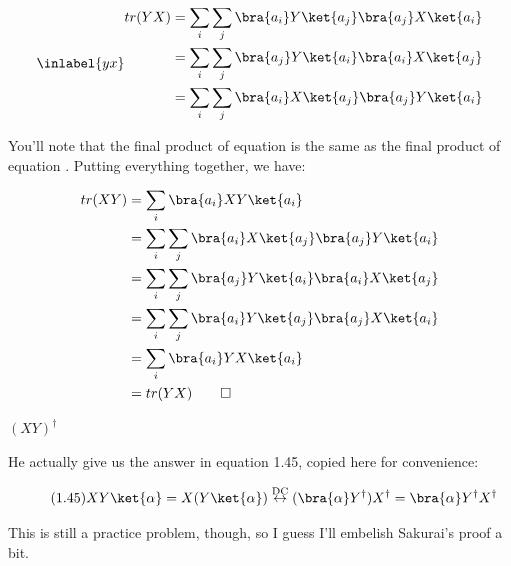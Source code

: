 \begin{answer}
\begin{equation}
  \inlabel{yx}
  \begin{split}
    tr(YX)
    &= \sum_i\sum_j\bra{a_i}Y\ket{a_j}\bra{a_j}X\ket{a_i}\\
    &= \sum_i\sum_j\bra{a_j}Y\ket{a_i}\bra{a_i}X\ket{a_j}\\
    &= \sum_i\sum_j\bra{a_i}X\ket{a_j}\bra{a_j}Y\ket{a_i}\\
  \end{split}
\end{equation}

You'll note that the final product of equation  is the same
as the final product of equation .  Putting everything
together, we have:

\begin{equation}
  \begin{split}
    tr(XY)
    &= \sum_i\bra{a_i}XY\ket{a_i}\\
    &= \sum_i\sum_j\bra{a_i}X\ket{a_j}\bra{a_j}Y\ket{a_i}\\
    &= \sum_i\sum_j\bra{a_j}Y\ket{a_i}\bra{a_i}X\ket{a_j}\\
    &= \sum_i\sum_j\bra{a_i}Y\ket{a_j}\bra{a_j}X\ket{a_i}\\
    &= \sum_i\bra{a_i}YX\ket{a_i}\\
    &= tr(YX) \qed\\
  \end{split}
\end{equation}




\begin{answerpart}{\texorpdfstring{$(XY)^\dagger$}{Hermitian of XY}}

  He actually give us the answer in equation 1.45, copied here for
  convenience:
  
  \begin{equation}
    \tag{1.45}
    XY\ket{\alpha}
    = X(Y\ket{\alpha})
    \overset{\text{DC}}{\leftrightarrow}
    (\bra{\alpha}Y^\dagger)X^\dagger
    = \bra{\alpha}Y^{\dagger}X^{\dagger}
  \end{equation}

  This is still a practice problem, though, so I guess I'll embelish
  Sakurai's proof a bit.


\end{answerpart}
\end{answer}
